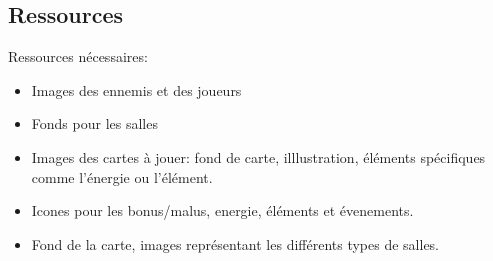 \subsection{Ressources}

Ressources nécessaires:
\begin{itemize}
    \item Images des ennemis et des joueurs
    \item Fonds pour les salles
    \item Images des cartes à jouer: fond de carte, illlustration, éléments spécifiques comme l'énergie ou l'élément.
    \item Icones pour les bonus/malus, energie, éléments et évenements.
    \item Fond de la carte, images représentant les différents types de salles.
\end{itemize}

\clearpage

